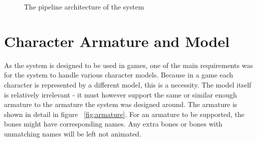 \begin{figure}[!ht]
\centerline{}
\caption{The pipeline architecture of the system}\label{fig:architecture}
\end{figure}

\section{Character Armature and Model}

As the system is designed to be used in games, one of the main requirements was for the system to handle various character models. Because in a game each character is represented by a different model, this is a necessity. The model itself is relatively irrelevant - it must however support the same or similar enough armature to the armature the system was designed around. The armature is shown in detail in figure ~\ref{fig:armature}. For an armature to be supported, the bones might have corresponding names. Any extra bones or bones with unmatching names will be left not animated.

